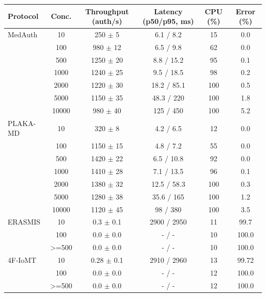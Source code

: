 \begin{tabular}{l|c|c|c|c|c}
\toprule
\textbf{Protocol} & \textbf{Conc.} & \textbf{Throughput (auth/s)} & \textbf{Latency (p50/p95, ms)} & \textbf{CPU (\%)} & \textbf{Error (\%)} \\
\midrule
MedAuth & 10 & 250 $\pm$ 5 & 6.1 / 8.2 & 15 & 0.0 \\
 & 100 & 980 $\pm$ 12 & 6.5 / 9.8 & 62 & 0.0 \\
 & 500 & 1250 $\pm$ 20 & 8.8 / 15.2 & 95 & 0.1 \\
 & 1000 & 1240 $\pm$ 25 & 9.5 / 18.5 & 98 & 0.2 \\
 & 2000 & 1220 $\pm$ 30 & 18.2 / 85.1 & 100 & 0.5 \\
 & 5000 & 1150 $\pm$ 35 & 48.3 / 220 & 100 & 1.8 \\
 & 10000 & 980 $\pm$ 40 & 125 / 450 & 100 & 5.2 \\
PLAKA-MD & 10 & 320 $\pm$ 8 & 4.2 / 6.5 & 12 & 0.0 \\
 & 100 & 1150 $\pm$ 15 & 4.8 / 7.2 & 55 & 0.0 \\
 & 500 & 1420 $\pm$ 22 & 6.5 / 10.8 & 92 & 0.0 \\
 & 1000 & 1410 $\pm$ 28 & 7.1 / 13.5 & 96 & 0.1 \\
 & 2000 & 1380 $\pm$ 32 & 12.5 / 58.3 & 100 & 0.3 \\
 & 5000 & 1280 $\pm$ 38 & 35.6 / 165 & 100 & 1.2 \\
 & 10000 & 1120 $\pm$ 45 & 98 / 380 & 100 & 3.5 \\
ERASMIS & 10 & 0.3 $\pm$ 0.1 & 2900 / 2950 & 11 & 99.7 \\
 & 100 & 0.0 $\pm$ 0.0 & - / - & 10 & 100.0 \\
 & >=500 & 0.0 $\pm$ 0.0 & - / - & 10 & 100.0 \\
4F-IoMT & 10 & 0.28 $\pm$ 0.1 & 2910 / 2960 & 13 & 99.72 \\
 & 100 & 0.0 $\pm$ 0.0 & - / - & 12 & 100.0 \\
 & >=500 & 0.0 $\pm$ 0.0 & - / - & 12 & 100.0 \\
\bottomrule
\end{tabular}
